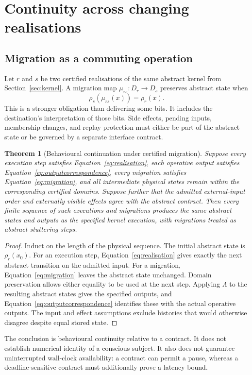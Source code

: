 \documentclass[11pt,a4paper]{article}
\newtheorem{theorem}{Theorem}[section]
\theoremstyle{definition}
\theoremstyle{remark}
\begin{document}
\section{Continuity across changing realisations}\label{sec:continuity}
\subsection{Migration as a commuting operation}
Let $r$ and $s$ be two certified realisations of the same abstract kernel from Section~\ref{sec:kernel}. A migration map $\mu_{rs}:D_r\to D_s$ preserves abstract state when
\begin{equation}\label{eq:migration}
 \rho_s(\mu_{rs}(x))=\rho_r(x).
\end{equation}
This is a stronger obligation than delivering some bits. It includes the destination's interpretation of those bits. Side effects, pending inputs, membership changes, and replay protection must either be part of the abstract state or be governed by a separate interface contract.

\begin{theorem}[Behavioural continuation under certified migration]\label{thm:continuation}
Suppose every execution step satisfies Equation~\eqref{eq:realisation}, each operative output satisfies Equation~\eqref{eq:outputcorrespondence}, every migration satisfies Equation~\eqref{eq:migration}, and all intermediate physical states remain within the corresponding certified domains. Suppose further that the admitted external-input order and externally visible effects agree with the abstract contract. Then every finite sequence of such executions and migrations produces the same abstract states and outputs as the specified kernel execution, with migrations treated as abstract stuttering steps.
\end{theorem}
\begin{proof}
Induct on the length of the physical sequence. The initial abstract state is $\rho_r(x_0)$. For an execution step, Equation~\eqref{eq:realisation} gives exactly the next abstract transition on the admitted input. For a migration, Equation~\eqref{eq:migration} leaves the abstract state unchanged. Domain preservation allows either equality to be used at the next step. Applying $\Lambda$ to the resulting abstract states gives the specified outputs, and Equation~\eqref{eq:outputcorrespondence} identifies these with the actual operative outputs. The input and effect assumptions exclude histories that would otherwise disagree despite equal stored state.
\end{proof}
The conclusion is behavioural continuity relative to a contract. It does not establish numerical identity of a conscious subject. It also does not guarantee uninterrupted wall-clock availability: a contract can permit a pause, whereas a deadline-sensitive contract must additionally prove a latency bound.
\end{document}
